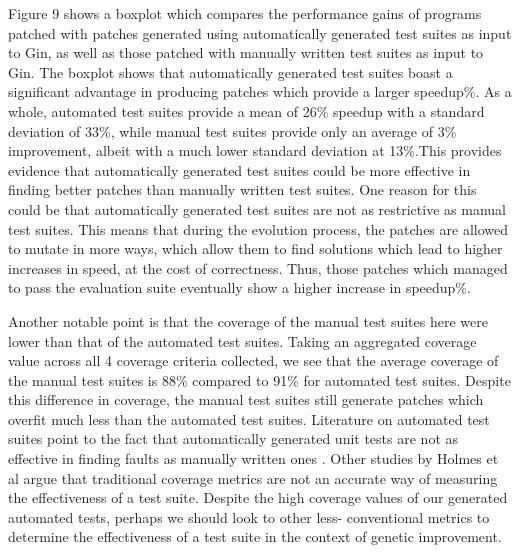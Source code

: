 \documentclass[titlepage]{article}
\begin{document}
Figure 9 shows a boxplot which compares the performance gains of programs patched with patches generated using automatically generated test suites as input to Gin, as well as those patched with manually written test suites as input to Gin. The boxplot shows that automatically generated test suites boast a significant advantage in producing patches which provide a larger speedup\%. As a whole, automated test suites provide a mean of 26\% speedup with a standard deviation of 33\%, while manual test suites provide only an average of 3\% improvement, albeit with a much lower standard deviation at 13\%.This provides evidence that automatically generated test suites could be more effective in finding better patches than manually written test suites. One reason for this could be that automatically generated test suites are not as restrictive as manual test suites. This means that during the evolution process, the patches are allowed to mutate in more ways, which allow them to find solutions which lead to higher increases in speed, at the cost of correctness. Thus, those patches which managed to pass the evaluation suite eventually show a higher increase in speedup\%. 

Another notable point is that the coverage of the manual test suites here were lower than that of the automated test suites. Taking an aggregated coverage value across all 4 coverage criteria collected, we see that the average coverage of the manual test suites is 88\% compared to 91\% for automated test suites. Despite this difference in coverage, the manual test suites still generate patches which overfit much less than the automated test suites. Literature on automated test suites point to the fact that automatically generated unit tests are not as effective in finding faults as manually written ones \cite{evosuitefaults}.  Other studies by Holmes et al \cite{coveragenotcorrelated} argue that traditional coverage metrics are not an accurate way of measuring the effectiveness of a test suite. Despite the high coverage values of our generated automated tests, perhaps we should look to other less- conventional metrics to determine the effectiveness of a test suite in the context of genetic improvement. \\
\end{document}
